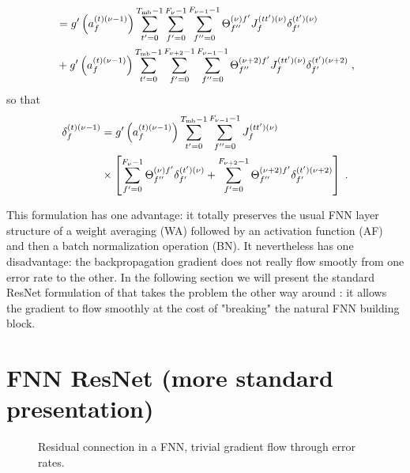 \begin{subappendices}
\begin{align}
%
&=g'\left(a_{f}^{(t)(\nu-1)}\right)
%
\sum_{t'=0}^{T_{{\rm mb}}-1}\sum_{f'=0}^{F_{\nu}-1}\sum^{F_{\nu-1}-1}_{f''=0}\Theta^{(\nu)f'}_{f''}
%
J^{(tt')(\nu)}_{f} \delta^{(t')(\nu)}_{f'}\notag\\
%
&+g'\left(a_{f}^{(t)(\nu-1)}\right)
%
\sum_{t'=0}^{T_{{\rm mb}}-1}\sum_{f'=0}^{F_{\nu+2}-1}\sum^{F_{\nu-1}-1}_{f''=0}\Theta^{(\nu+2)f'}_{f''}
%
J^{(tt')(\nu)}_{f} \delta^{(t')(\nu+2)}_{f'}\;,
\end{align}
so that
\begin{align}
\delta^{(t)(\nu-1)}_f&=g'\left(a_{f}^{(t)(\nu-1)}\right)
%
\sum_{t'=0}^{T_{{\rm mb}}-1}\sum^{F_{\nu-1}-1}_{f''=0}J^{(tt')(\nu)}_{f}\notag\\
%
&\times\left[\sum_{f'=0}^{F_{\nu}-1}\Theta^{(\nu)f'}_{f''}\delta^{(t')(\nu)}_{f'}+
%
\sum_{f'=0}^{F_{\nu+2}-1}\Theta^{(\nu+2)f'}_{f''}\delta^{(t')(\nu+2)}_{f'}\right]\;.
\end{align}

This formulation has one advantage: it totally preserves the usual FNN layer structure of a weight averaging (WA) followed by an activation function (AF) and then a batch normalization operation (BN). It nevertheless has one disadvantage: the backpropagation gradient does not really flow smootly from one error rate to the other. In the following section we will present the standard ResNet formulation of that takes the problem the other way around : it allows the gradient to flow smoothly at the cost of "breaking" the natural FNN building block. 

\section{FNN ResNet (more standard presentation)} \label{sec:ResnetFNN2}

\begin{figure}[H]
\begin{center}
\end{center}
\caption{\label{fig:fc_resnet_3} Residual connection in a FNN, trivial gradient flow through error rates.}
\end{figure}


\end{subappendices}
